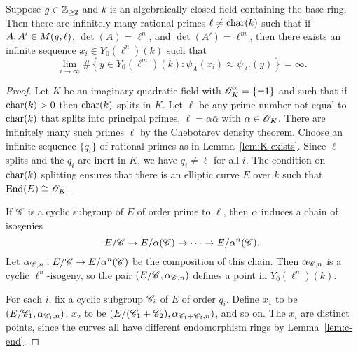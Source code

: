 \documentclass{amsart}
\begin{document}
\begin{proposition}\label{prop:lim-degree}
Suppose $g\in\mathbb{Z}_{\ge 2}$ and $k$ is an algebraically closed field containing the base ring.
  Then there are infinitely many rational primes $\ell\neq\operatorname{char}(k)$ such that if 
   $A,A' \in M(g,\ell)$, $\det(A) = \ell^n$, and $\det(A') = \ell^m$,
  then there exists an infinite sequence $x_i \in Y_0(\ell^n)(k)$ such that
  \[
    \lim_{i \to \infty}\#\left\{ y \in Y_0(\ell^m)(k) \colon \psi_A(x_i) \approx \psi_{A'}(y) \right\} = \infty.
  \]
\end{proposition}
\begin{proof}
  Let $K$ be an imaginary quadratic field %
with $\mathscr{O}_K^\times = \{\pm 1\}$ and such that if $\operatorname{char}(k) > 0$ then $\operatorname{char}(k)$ splits in $K$.
Let $\ell$ be any prime number not equal to $\operatorname{char}(k)$ that splits into principal primes, $\ell = \alpha{\bar \alpha}$ with $ \alpha\in \mathscr{O}_K$.
There are infinitely many such primes $\ell$ by the Chebotarev density theorem.
Choose an infinite sequence $\{q_i\}$ of rational primes as in Lemma~\ref{lem:K-exists}. Since $\ell$ splits and the $q_i$ are
inert in $K$, we have $q_i\ne \ell$ for all $i$. %
The condition on $\operatorname{char}(k)$ splitting ensures that there is an elliptic curve $E$ over $k$ such that $\operatorname{End}(E) \cong \mathscr{O}_K$.

  If $\mathscr{C}$ is a cyclic subgroup of $E$ of order prime to $\ell$, then $\alpha$ induces a chain of isogenies
  \[
    E/\mathscr{C} \to E/\alpha(\mathscr{C}) \to \cdots \to E/\alpha^n(\mathscr{C}).
  \]
  Let $\alpha_{\mathscr{C},n}: E/\mathscr{C} \to E/\alpha^n(\mathscr{C})$ be the composition of this chain. Then $\alpha_{\mathscr{C},n}$ is a cyclic $\ell^n$-isogeny, so the pair $(E/\mathscr{C},\alpha_{\mathscr{C},n})$ defines a point in $Y_0(\ell^n)(k)$.

    For each $i$, fix a cyclic subgroup $\mathscr{C}_i$ of $E$ of order $q_i$. Define $x_1$ to be $(E/\mathscr{C}_1,\alpha_{\mathscr{C}_1,n})$, $x_2$ to be $(E/(\mathscr{C}_1 + \mathscr{C}_2), \alpha_{\mathscr{C}_1 + \mathscr{C}_2,n})$, and so on. The $x_i$ are distinct points, since the curves all have different endomorphism rings by Lemma~\ref{lem:c-end}.


\end{proof}
\end{document}
